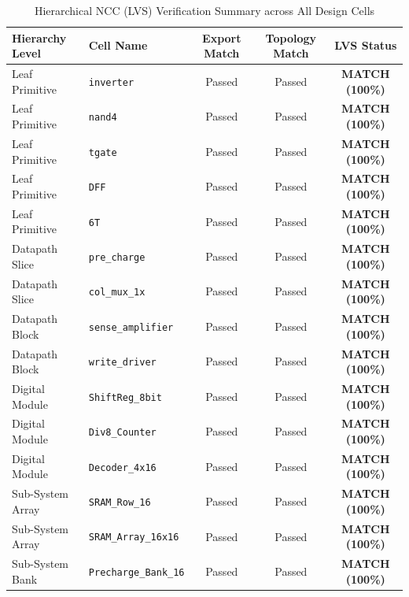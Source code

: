 \documentclass[10pt,a4paper,titlepage]{article}
\begin{document}
\begin{table}[h!]
\centering\small\sffamily
\caption{Hierarchical NCC (LVS) Verification Summary across All Design Cells}
\begin{tabularx}{0.95\textwidth}{llccc}
\toprule
\textbf{Hierarchy Level} & \textbf{Cell Name} & \textbf{Export Match} & \textbf{Topology Match} & \textbf{LVS Status} \\
\midrule
Leaf Primitive & \texttt{inverter} & Passed & Passed & \textcolor{emerald}{\textbf{MATCH (100\%)}} \\
Leaf Primitive & \texttt{nand4} & Passed & Passed & \textcolor{emerald}{\textbf{MATCH (100\%)}} \\
Leaf Primitive & \texttt{tgate} & Passed & Passed & \textcolor{emerald}{\textbf{MATCH (100\%)}} \\
Leaf Primitive & \texttt{DFF} & Passed & Passed & \textcolor{emerald}{\textbf{MATCH (100\%)}} \\
Leaf Primitive & \texttt{6T} & Passed & Passed & \textcolor{emerald}{\textbf{MATCH (100\%)}} \\
Datapath Slice & \texttt{pre\_charge} & Passed & Passed & \textcolor{emerald}{\textbf{MATCH (100\%)}} \\
Datapath Slice & \texttt{col\_mux\_1x} & Passed & Passed & \textcolor{emerald}{\textbf{MATCH (100\%)}} \\
Datapath Block & \texttt{sense\_amplifier} & Passed & Passed & \textcolor{emerald}{\textbf{MATCH (100\%)}} \\
Datapath Block & \texttt{write\_driver} & Passed & Passed & \textcolor{emerald}{\textbf{MATCH (100\%)}} \\
Digital Module & \texttt{ShiftReg\_8bit} & Passed & Passed & \textcolor{emerald}{\textbf{MATCH (100\%)}} \\
Digital Module & \texttt{Div8\_Counter} & Passed & Passed & \textcolor{emerald}{\textbf{MATCH (100\%)}} \\
Digital Module & \texttt{Decoder\_4x16} & Passed & Passed & \textcolor{emerald}{\textbf{MATCH (100\%)}} \\
Sub-System Array & \texttt{SRAM\_Row\_16} & Passed & Passed & \textcolor{emerald}{\textbf{MATCH (100\%)}} \\
Sub-System Array & \texttt{SRAM\_Array\_16x16} & Passed & Passed & \textcolor{emerald}{\textbf{MATCH (100\%)}} \\
Sub-System Bank & \texttt{Precharge\_Bank\_16} & Passed & Passed & \textcolor{emerald}{\textbf{MATCH (100\%)}} \\

\end{tabularx}
\end{table}
\end{document}
